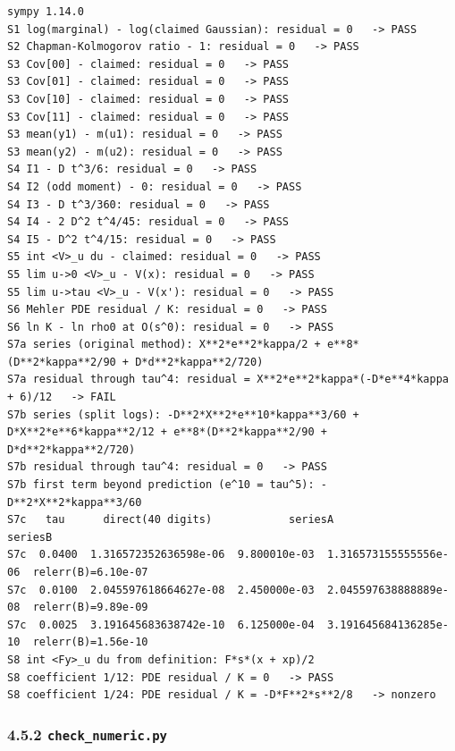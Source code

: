 \documentclass[11pt,a4paper]{article}
\begin{document}
\begin{lstlisting}
sympy 1.14.0
S1 log(marginal) - log(claimed Gaussian): residual = 0   -> PASS
S2 Chapman-Kolmogorov ratio - 1: residual = 0   -> PASS
S3 Cov[00] - claimed: residual = 0   -> PASS
S3 Cov[01] - claimed: residual = 0   -> PASS
S3 Cov[10] - claimed: residual = 0   -> PASS
S3 Cov[11] - claimed: residual = 0   -> PASS
S3 mean(y1) - m(u1): residual = 0   -> PASS
S3 mean(y2) - m(u2): residual = 0   -> PASS
S4 I1 - D t^3/6: residual = 0   -> PASS
S4 I2 (odd moment) - 0: residual = 0   -> PASS
S4 I3 - D t^3/360: residual = 0   -> PASS
S4 I4 - 2 D^2 t^4/45: residual = 0   -> PASS
S4 I5 - D^2 t^4/15: residual = 0   -> PASS
S5 int <V>_u du - claimed: residual = 0   -> PASS
S5 lim u->0 <V>_u - V(x): residual = 0   -> PASS
S5 lim u->tau <V>_u - V(x'): residual = 0   -> PASS
S6 Mehler PDE residual / K: residual = 0   -> PASS
S6 ln K - ln rho0 at O(s^0): residual = 0   -> PASS
S7a series (original method): X**2*e**2*kappa/2 + e**8*(D**2*kappa**2/90 + D*d**2*kappa**2/720)
S7a residual through tau^4: residual = X**2*e**2*kappa*(-D*e**4*kappa + 6)/12   -> FAIL
S7b series (split logs): -D**2*X**2*e**10*kappa**3/60 + D*X**2*e**6*kappa**2/12 + e**8*(D**2*kappa**2/90 + D*d**2*kappa**2/720)
S7b residual through tau^4: residual = 0   -> PASS
S7b first term beyond prediction (e^10 = tau^5): -D**2*X**2*kappa**3/60
S7c   tau      direct(40 digits)            seriesA                  seriesB
S7c  0.0400  1.316572352636598e-06  9.800010e-03  1.316573155555556e-06  relerr(B)=6.10e-07
S7c  0.0100  2.045597618664627e-08  2.450000e-03  2.045597638888889e-08  relerr(B)=9.89e-09
S7c  0.0025  3.191645683638742e-10  6.125000e-04  3.191645684136285e-10  relerr(B)=1.56e-10
S8 int <Fy>_u du from definition: F*s*(x + xp)/2
S8 coefficient 1/12: PDE residual / K = 0   -> PASS
S8 coefficient 1/24: PDE residual / K = -D*F**2*s**2/8   -> nonzero
\end{lstlisting}

\hypertarget{check_numeric.py}{%
\subsubsection{\texorpdfstring{4.5.2 \texttt{check\_numeric.py}}{4.5.2 }}\label{check_numeric.py}}
\end{document}
